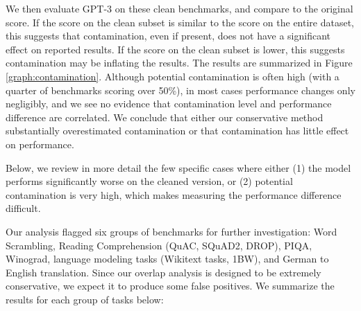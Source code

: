 We then evaluate GPT-3 on these clean benchmarks, and compare to the original score.  If the score on the clean subset is similar to the score on the entire dataset, this suggests that contamination, even if present, does not have a significant effect on reported results.  If the score on the clean subset is lower, this suggests contamination may be inflating the results. The results are summarized in Figure \ref{graph:contamination}.  Although potential contamination is often high (with a quarter of benchmarks scoring over 50\%), in most cases performance changes only negligibly, and we see no evidence that contamination level and performance difference are correlated.  We conclude that either our conservative method substantially overestimated contamination or that contamination has little effect on performance.

Below, we review in more detail the few specific cases where either (1) the model performs significantly worse on the cleaned version, or (2) potential contamination is very high, which makes measuring the performance difference difficult.

Our analysis flagged six groups of benchmarks for further investigation: Word Scrambling, Reading Comprehension (QuAC, SQuAD2, DROP), PIQA, Winograd, language modeling tasks (Wikitext tasks, 1BW), and German to English translation. Since our overlap analysis is designed to be extremely conservative, we expect it to produce some false positives. We summarize the results for each group of tasks below:

